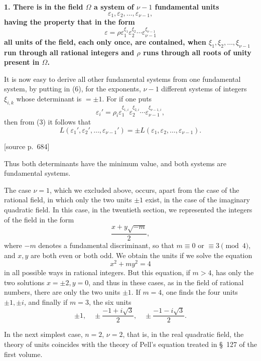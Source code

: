 \documentclass[11pt]{article}
\newcommand{\srcpage}[1]{\par\medskip\noindent\textsf{[source p.~#1]}\par\smallskip}
\begin{document}
\textbf{1. There is in the field $\Omega$ a system of $\nu-1$ fundamental units}
\begin{equation}
\varepsilon_1,\varepsilon_2,\ldots,\varepsilon_{\nu-1},
\tag{5}
\end{equation}
\textbf{having the property that in the form}
\begin{equation}
\varepsilon=\rho\varepsilon_1^{\xi_1}\varepsilon_2^{\xi_2}\cdots\varepsilon_{\nu-1}^{\xi_{\nu-1}}
\tag{6}
\end{equation}
\textbf{all units of the field, each only once, are contained, when $\xi_1,\xi_2,\ldots,\xi_{\nu-1}$ run through all rational integers and $\rho$ runs through all roots of unity present in $\Omega$.}

It is now easy to derive all other fundamental systems from one fundamental system, by putting in (6), for the exponents, $\nu-1$ different systems of integers $\xi_{i,k}$ whose determinant is $=\pm1$. For if one puts
\[
\varepsilon_i'=\rho_i\varepsilon_1^{\xi_{1,i}}\varepsilon_2^{\xi_{2,i}}\cdots\varepsilon_{\nu-1}^{\xi_{\nu-1,i}},
\]
then from (3) it follows that
\[
L(\varepsilon_1',\varepsilon_2',\ldots,\varepsilon_{\nu-1}')=\pm L(\varepsilon_1,\varepsilon_2,\ldots,\varepsilon_{\nu-1}).
\]

\srcpage{684}
Thus both determinants have the minimum value, and both systems are fundamental systems.

The case $\nu=1$, which we excluded above, occurs, apart from the case of the rational field, in which only the two units $\pm1$ exist, in the case of the imaginary quadratic field. In this case, in the twentieth section, we represented the integers of the field in the form
\[
\frac{x+y\sqrt{-m}}{2},
\]
where $-m$ denotes a fundamental discriminant, so that $m\equiv0$ or $\equiv3\pmod 4$, and $x,y$ are both even or both odd. We obtain the units if we solve the equation
\[
x^2+my^2=4
\]
in all possible ways in rational integers. But this equation, if $m>4$, has only the two solutions $x=\pm2,y=0$, and thus in these cases, as in the field of rational numbers, there are only the two units $\pm1$. If $m=4$, one finds the four units $\pm1,\pm i$, and finally if $m=3$, the six units
\[
\pm1,
\quad \pm\frac{-1+i\sqrt3}{2},
\quad \pm\frac{-1-i\sqrt3}{2}.
\]

In the next simplest case, $n=2$, $\nu=2$, that is, in the real quadratic field, the theory of units coincides with the theory of Pell's equation treated in \S~127 of the first volume.
\end{document}
